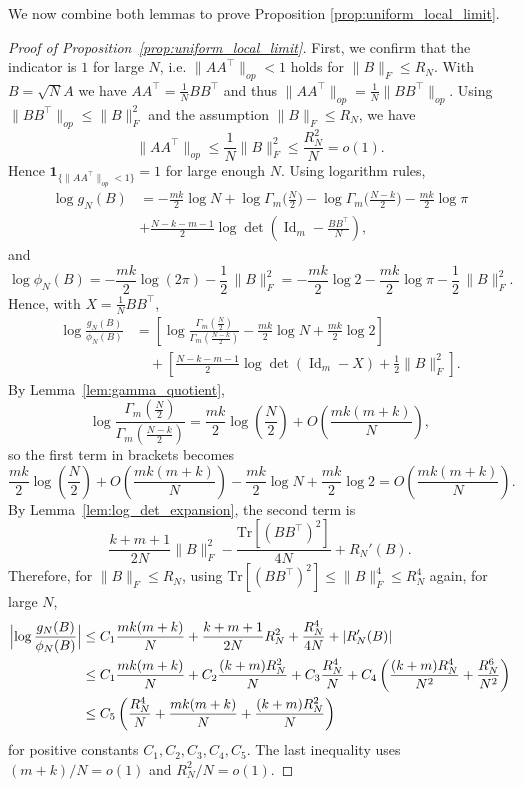 \documentclass[11pt,a4paper,twoside]{article}
\theoremstyle{definition}
\begin{document}
		We now combine both lemmas to prove Proposition \ref{prop:uniform_local_limit}.

	\begin{proof}[Proof of Proposition~\ref{prop:uniform_local_limit}]
		First, we confirm that the indicator is $1$ for large $N$, i.e. \(\|AA^\top \|_{op}<1\) holds for \(\|B\|_F \le R_N\). With $B = \sqrt{N}A$ we have \(AA^\top = \frac{1}{N}BB^\top\) and thus \(\|AA^\top\|_{op} = \frac{1}{N}\|BB^\top\|_{op}\).  Using \(\|BB^\top\|_{op} \le \|B\|_F^2\) and the assumption \(\|B\|_F \le R_N\), we have
		\[ \|AA^\top\|_{op} \le \frac{1}{N} \|B\|_F^2 \le \frac{R_N^2}{N} = o(1). \]
		Hence \(\mathbf1_{\{\|AA^\top\|_{op}<1\}} = 1\) for large enough \(N\). Using logarithm rules, 
		\begin{align*}
		 \log g_N(B) &= -\frac{mk}{2}\log N + \log\Gamma_m\bigl(\frac N2\bigr) - \log\Gamma_m\bigl(\frac{N-k}2\bigr) - \frac{mk}{2}\log\pi\\
		 & + \frac{N-k-m-1}2\log\det(\operatorname{Id}_m - \frac{BB^\top}N), 
		\end{align*}
		and
		$$ \log\phi_{N}(B) = -\frac{mk}{2}\log(2\pi) - \frac12\,\|B\|_F^2 = -\frac{mk}{2}\log 2 - \frac{mk}{2}\log\pi - \frac12\,\|B\|_F^2. $$
		Hence, with \(X=\frac1N BB^\top\),
		\begin{align*} \log\frac{g_N(B)}{\phi_{N}(B)} &= \left[ \log\frac{\Gamma_m(\frac N2)}{\Gamma_m(\frac{N-k}2)} - \frac{mk}{2}\log N + \frac{mk}{2}\log 2 \right]  \\ & \quad + \left[ \frac{N-k-m-1}{2}\log\det(\operatorname{Id}_m-X) + \frac12\|B\|_F^2 \right].
		\end{align*}
		By Lemma~\ref{lem:gamma_quotient},
		$$ \log\frac{\Gamma_m(\frac N2)}{\Gamma_m(\frac{N-k}2)} = \frac{mk}{2}\log(\frac N2) + O\left(\frac{mk(m+k)}{N}\right), $$
		so the first term in brackets becomes
		$$ \frac{mk}{2}\log(\frac N2) + O\left(\frac{mk(m+k)}{N}\right) - \frac{mk}{2}\log N + \frac{mk}{2}\log 2 = O\left(\frac{mk(m+k)}{N}\right). $$
		By Lemma~\ref{lem:log_det_expansion}, the second term is
		$$ \frac{k+m+1}{2N}\|B\|_F^2 - \frac{\mathrm{Tr}[(BB^\top)^2]}{4N} + R_N'(B). $$
		Therefore, for \(\|B\|_F\le R_N\), using \(\mathrm{Tr}[(BB^\top)^2] \le \|B\|_F^4 \le R_N^4\) again, for large $N$,
		\begin{align*} 
		\Bigl|\log\frac{g_N(B)}{\phi_{N}(B)}\Bigr| &\le C_1\frac{mk(m+k)}{N} + \frac{k+m+1}{2N}R_N^2 + \frac{R_N^4}{4N} + |R_N'(B)|\\
		& \le C_1\frac{mk(m+k)}{N} + C_2\frac{(k+m)R_N^2}{N} + C_3\frac{R_N^4}{N} + C_4\left(\frac{(k+m)R_N^4}{N^2} + \frac{R_N^6}{N^2}\right)\\
		& \le C_5\left(\frac{R_N^4}{N} + \frac{mk(m+k)}{N} + \frac{(k+m)R_N^2}{N}\right)
		\end{align*}
		for positive constants \(C_1, C_2, C_3, C_4, C_5\). The last inequality uses $(m+k)/N=o(1)$ and $R_N^2/N=o(1)$. 
		\end{proof}
\end{document}
